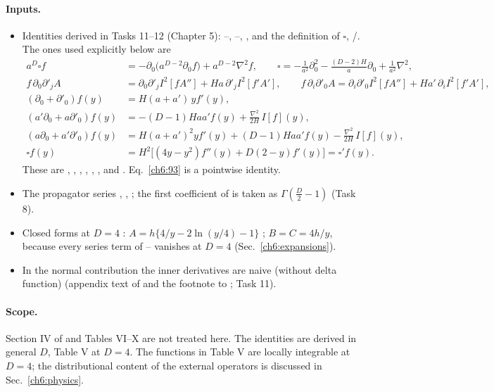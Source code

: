 \paragraph{Inputs.}
\begin{itemize}[leftmargin=14pt]
\item[(G1)] Identities derived in Tasks 11--12 \tD{} (Chapter 5): --, --, ,  and the definition of
$\square$, /. The ones used explicitly below are
\begin{align}
a^D\square f&=-\partial_0\big(a^{D-2}\partial_0f\big)+a^{D-2}\nabla^2f, \qquad
\square=-\frac{1}{a^2}\partial_0^2-\frac{(D-2)H}{a}\partial_0+\frac1{a^2}\nabla^2, \label{ch6:box}\\
f\,\partial_0\partial'_jA&=\partial_0\partial'_jI^2[fA'']+Ha\,\partial'_jI^2[f'A'], \qquad
f\,\partial_i\partial'_0A=\partial_i\partial'_0I^2[fA'']+Ha'\,\partial_iI^2[f'A'], \label{ch6:76-77}\\
(\partial_0+\partial'_0)f(y)&=H(a+a')\,y f'(y), \label{ch6:84}\\
(a'\partial_0+a\partial'_0)f(y)&=-(D-1)Haa'f(y)+\frac{\nabla^2}{2H}\,I[f](y), \label{ch6:86}\\
(a\partial_0+a'\partial'_0)f(y)&=H(a+a')^2y f'(y)+(D-1)Haa'f(y)-\frac{\nabla^2}{2H}\,I[f](y), \label{ch6:88}\\
\square f(y)&=H^2\big[(4y-y^2)f''(y)+D(2-y)f'(y)\big]=\square'f(y). \label{ch6:93}
\end{align}
These are , , , , , ,  and . Eq.~\eqref{ch6:93} is a pointwise identity.
\item[(G2)] The propagator series , ,  \tP; the first coefficient of  is taken as $\Gamma(\frac D2-1)$ (Task 8).
\item[(G3)] Closed forms at $D=4$ \tD: $A=h\{4/y-2\ln(y/4)-1\}$ ; $B=C=4h/y$, because every series term of --
vanishes at $D=4$ (Sec.~\ref{ch6:expansions}).
\item[(G4)] In the normal contribution the inner derivatives are naive (without delta function) \tP{} (appendix text of \PI{} and the footnote to
; Task 11).
\end{itemize}

\paragraph{Scope.} Section IV of \PI{} and Tables VI--X are not treated here. The identities are derived in general $D$, Table V at $D=4$.
The functions in Table V are locally integrable at $D=4$; the distributional content of the external operators is discussed in
Sec.~\ref{ch6:physics}.

